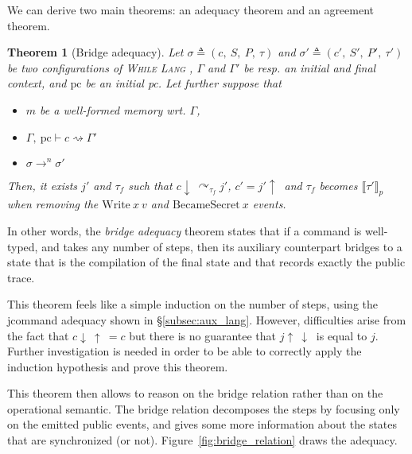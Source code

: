 \documentclass[10pt]{article}
\newcommand{\pc}{\mathrm{pc}}
\newcommand{\ctx}{\Gamma}
\newcommand{\conf}{\sigma}
\newcommand{\typing}[4]{ #1,~#2 \vdash #3 \rightsquigarrow #4}
\newcommand{\execn}[3] { #1 \rightarrow^{#2} #3 }
\newcommand{\bridge}[3] { #1 \curvearrowright_{#2} #3 }
\newcommand{\whilelang}{\textsc{While Lang} }
\newcommand{\pproj}[1]{\llbracket #1 \rrbracket_{p}}
\newcommand{\compile}[1]{#1\!\downarrow\ }
\newcommand{\uncompile}[1]{#1\!\uparrow\ }
\newtheorem{theorem}{Theorem}
\begin{document}

We can derive two main theorems: an adequacy theorem and an agreement theorem.
\begin{theorem}[Bridge adequacy]\label{thm:adequacy}
  Let $\conf \triangleq (c,~S,~P,~\tau)$ and $\conf' \triangleq (c',~S',~P',~\tau')$ be two
  configurations of \whilelang, $\ctx$ and $\ctx'$ be resp. an initial and final context,
  and $\pc$ be an initial pc.
  Let further suppose that

 \begin{itemize}
   \item $m$ be a well-formed memory wrt. $\ctx$,
   \item \(\typing{\ctx}{\pc}{c}{\ctx'} \)
   \item \( \execn{\conf}{n}{\conf'} \)
 \end{itemize}

  Then, it exists $j'$ and $\tau_{f}$ such that \( \bridge{\compile{c}}{\tau_{f}}{j'} \), $c' = \uncompile{j'}$ and \( \tau_f \) becomes \( \pproj{\tau'} \) when removing the \( \mathrm{Write}~x~v \) and \( \mathrm{BecameSecret}~x \) events.
\end{theorem}


In other words, the \emph{bridge adequacy} theorem states that if a command is well-typed, and takes
any number of steps, then its auxiliary counterpart bridges to a state that is the compilation of
the final state and that records exactly the public trace.

This theorem feels like a simple induction on the number of steps, using the jcommand adequacy shown in \S\ref{subsec:aux_lang}. However, difficulties arise from the fact that \( \uncompile{\compile{c}}=c \) but there is no guarantee that \( \compile{\uncompile{j}} \) is equal to \( j \). Further investigation is needed in order to be able to correctly apply the induction hypothesis and prove this theorem.

This theorem then allows to reason on the bridge relation rather than on the operational semantic.
The bridge relation decomposes the steps by focusing only on the emitted public events, and gives
some more information about the states that are synchronized (or not).
Figure~\ref{fig:bridge_relation} draws the adequacy.
\end{document}
